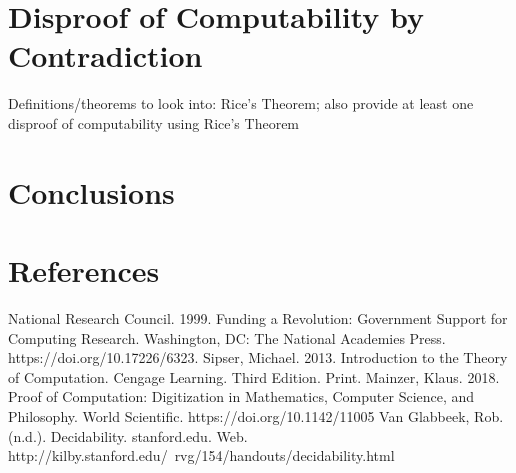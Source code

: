 \documentclass{article}
\begin{document}
\section{Disproof of Computability by Contradiction}
Definitions/theorems to look into: Rice's Theorem; also provide at least one disproof of computability using Rice's Theorem

\section{Conclusions}

\section{References}
\begin{thebibliography}{100}
	 National Research Council. 1999. Funding a Revolution: Government Support for Computing Research. Washington, DC: The National Academies Press. https://doi.org/10.17226/6323.
	 Sipser, Michael. 2013. Introduction to the Theory of Computation. Cengage Learning. Third Edition. Print.
	 Mainzer, Klaus. 2018. Proof of Computation: Digitization in Mathematics, Computer Science, and Philosophy. World Scientific. https://doi.org/10.1142/11005
	 Van Glabbeek, Rob. (n.d.). Decidability. stanford.edu. Web. http://kilby.stanford.edu/~rvg/154/handouts/decidability.html
\end{thebibliography}
\end{document}
